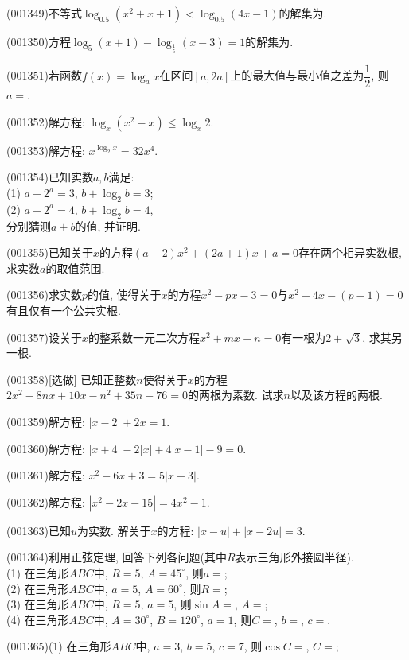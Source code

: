 \item (001349)不等式$\log_{0.5}(x^2+x+1)<\log_{0.5}(4x-1)$的解集为.
\item (001350)方程$\log_5(x+1)-\log_{\frac{1}{5}}(x-3)=1$的解集为.
\item (001351)若函数$f(x)=\log_a x$在区间$[a,2a]$上的最大值与最小值之差为$\dfrac{1}{2}$, 则$a=$.
\item (001352)解方程: $\log_x(x^2-x)\le \log_x 2$.
\item (001353)解方程: $x^{\log_2 x}=32x^4$.
\item (001354)已知实数$a,b$满足: \\ 
(1) $a+2^a=3$, $b+\log_2 b=3$;\\ 
(2) $a+2^a=4$, $b+\log_2 b=4$, \\ 
分别猜测$a+b$的值, 并证明.
\item (001355)已知关于$x$的方程$(a-2)x^2+(2a+1)x+a=0$存在两个相异实数根, 求实数$a$的取值范围.
\item (001356)求实数$p$的值, 使得关于$x$的方程$x^2-px-3=0$与$x^2-4x-(p-1)=0$有且仅有一个公共实根.
\item (001357)设关于$x$的整系数一元二次方程$x^2+mx+n=0$有一根为$2+\sqrt{3}$, 求其另一根.
\item (001358)[选做]
已知正整数$n$使得关于$x$的方程$2x^2-8nx+10x-n^2+35n-76=0$的两根为素数. 试求$n$以及该方程的两根.
\item (001359)解方程: $|x-2|+2x=1$.
\item (001360)解方程: $|x+4|-2|x|+4|x-1|-9=0$.
\item (001361)解方程: $x^2-6x+3=5|x-3|$.
\item (001362)解方程: $|x^2-2x-15|=4x^2-1$.
\item (001363)已知$u$为实数. 解关于$x$的方程: $|x-u|+|x-2u|=3$.
\item (001364)利用正弦定理, 回答下列各问题(其中$R$表示三角形外接圆半径).\\ 
(1) 在三角形$ABC$中, $R=5$, $A=45^\circ$, 则$a=$;\\ 
(2) 在三角形$ABC$中, $a=5$, $A=60^\circ$, 则$R=$;\\ 
(3) 在三角形$ABC$中, $R=5$, $a=5$, 则$\sin A=$, $A=$;\\ 
(4) 在三角形$ABC$中, $A=30^\circ$, $B=120^\circ$, $a=1$, 则$C=$, $b=$, $c=$.
\item (001365)(1) 在三角形$ABC$中, $a=3$, $b=5$, $c=7$, 则$\cos C=$, $C=$;\\ 
